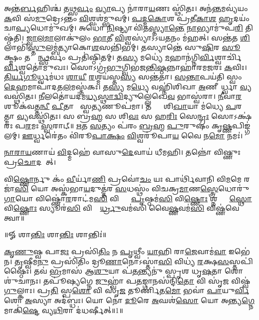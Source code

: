 𑌅𑌨𑍍𑌤॑\ul{𑌰𑍍𑌬}𑌹𑌿𑌶𑍍𑌚॑ 𑌤\ul{𑌥𑍍𑌸}\ul{𑌰𑍍𑌵𑌂} \ul{𑌵𑍍𑌯𑌾}𑌪𑍍𑌯 𑌨𑌾॑𑌰𑌾\ul{𑌯}𑌣𑌃 𑌸𑍍𑌥𑌿॑𑌤𑌃। 𑌅𑌨॑\ul{𑌨𑍍𑌤}𑌮𑌵𑍍𑌯॑𑌯𑌂 \ul{𑌕}𑌵𑌿 𑌸॑\ul{𑌮𑍁}𑌦𑍍𑌰𑍇𑌽𑌨𑍍𑌤𑌂॑  \ul{𑌵𑌿}𑌶𑍍𑌵𑌶॑𑌮𑍍𑌭𑍁𑌵𑌮𑍍। \ul{𑌪}\ul{𑌦𑍍𑌮}\ul{𑌕𑍋}𑌶 𑌪𑍍𑌰॑𑌤𑍀\ul{𑌕𑌾}\ul{𑌶}\ul{} \ul{𑌹𑍃}𑌦𑌯𑌂॑ 𑌚𑌾\ul{𑌪𑍍𑌯}𑌧𑍋𑌮𑍁॑𑌖𑌮𑍍। 𑌅𑌧𑍋॑ \ul{𑌨𑌿}𑌷𑍍𑌟𑍍𑌯𑌾 𑌵𑌿॑𑌤\ul{𑌸𑍍𑌤𑍍𑌯𑌾}\ul{𑌨𑍍𑌤𑍇} \ul{𑌨𑌾}𑌭𑍍𑌯𑌾𑌮𑍁॑𑌪\ul{𑌰𑌿} 𑌤𑌿𑌷𑍍𑌠॑𑌤𑌿। \ul{𑌜𑍍𑌵𑌾}\ul{𑌲}\ul{𑌮𑌾}𑌲𑌾𑌕𑍁॑𑌲𑌂 \ul{𑌭𑌾}\ul{𑌤𑍀} \ul{𑌵𑌿}𑌶𑍍𑌵𑌸𑍍𑌯𑌾॑𑌽𑌽𑌯\ul{𑌤}𑌨𑌂 𑌮॑𑌹𑌤𑍍। 𑌸𑌨𑍍𑌤॑𑌤 \ul{𑌶𑌿}𑌲𑌾𑌭𑌿॑\ul{𑌸𑍍𑌤𑍁}\-𑌲𑌮𑍍𑌬॑𑌤𑍍𑌯𑌾𑌕𑍋\ul{𑌶}𑌸𑌨𑍍𑌨𑌿॑𑌭𑌮𑍍। 𑌤𑌸𑍍𑌯𑌾𑌨𑍍𑌤𑍇॑ 𑌸𑍁\ul{𑌷𑌿}𑌰 \ul{𑌸𑍂}𑌕𑍍𑌷𑍍𑌮𑌂 𑌤𑌸𑍍𑌮𑌿᳚\ul{𑌨𑍍𑌥𑍍𑌸}𑌰𑍍𑌵𑌂 𑌪𑍍𑌰𑌤𑌿॑𑌷𑍍𑌠𑌿𑌤𑌮𑍍। 𑌤\ul{𑌸𑍍𑌯} 𑌮𑌧𑍍𑌯𑍇॑ \ul{𑌮}𑌹𑌾𑌨॑\-𑌗𑍍𑌨𑌿\ul{𑌰𑍍𑌵𑌿}𑌶𑍍𑌵𑌾𑌰𑍍𑌚𑌿॑\ul{𑌰𑍍𑌵𑌿}𑌶𑍍𑌵𑌤𑍋॑𑌮𑍁𑌖𑌃। 𑌸𑍋𑌽𑌗𑍍𑌰॑\ul{𑌭𑍁}𑌗𑍍𑌵𑌿𑌭॑𑌜\ul{𑌨𑍍𑌤𑌿}\ul{𑌷𑍍𑌠}𑌨𑍍𑌨𑌾𑌹𑌾॑𑌰𑌮\ul{𑌜}𑌰𑌃 \ul{𑌕}𑌵𑌿𑌃। \ul{𑌤𑌿}\ul{𑌰𑍍𑌯}\ul{𑌗𑍂}𑌰𑍍𑌧𑍍𑌵𑌮॑𑌧𑌃 \ul{𑌶𑌾}\ul{𑌯𑍀} \ul{𑌰}𑌶𑍍𑌮𑌯॑𑌸𑍍𑌤\ul{𑌸𑍍𑌯} 𑌸𑌨𑍍𑌤॑𑌤𑌾। \ul{𑌸}\ul{𑌨𑍍𑌤𑌾}𑌪𑌯॑𑌤𑌿 𑌸𑍍𑌵𑌂 \ul{𑌦𑍇}𑌹𑌮𑌾𑌪𑌾॑𑌦𑌤\ul{𑌲}𑌮𑌸𑍍𑌤॑𑌕𑌃। 𑌤\ul{𑌸𑍍𑌯} 𑌮\ul{𑌧𑍍𑌯𑍇} 𑌵𑌹𑍍𑌨𑌿॑𑌶𑌿𑌖𑌾 \ul{𑌅}𑌣𑍀𑌯𑍋᳚𑌰𑍍𑌧𑍍𑌵𑌾 \ul{𑌵𑍍𑌯}𑌵𑌸𑍍𑌥𑌿॑𑌤𑌃। \ul{𑌨𑍀}𑌲𑌤𑍋॑𑌯𑌦॑\-𑌮\ul{𑌧𑍍𑌯}\ul{𑌸𑍍𑌥𑌾}\ul{𑌦𑍍𑌵𑌿}𑌦𑍍𑌯𑍁𑌲𑍍𑌲𑍇॑𑌖𑍇\ul{𑌵}  𑌭𑌾𑌸𑍍𑌵॑𑌰𑌾। \ul{𑌨𑍀}𑌵𑌾\ul{𑌰}𑌶𑍂𑌕॑𑌵\ul{𑌤𑍍𑌤}\ul{𑌨𑍍𑌵𑍀} \ul{𑌪𑍀}𑌤𑌾 𑌭𑌾᳚𑌸𑍍𑌵\ul{𑌤𑍍𑌯}𑌣𑍂𑌪॑𑌮𑌾। 𑌤𑌸𑍍𑌯𑌾𑌃᳚ 𑌶𑌿\ul{𑌖𑌾}𑌯𑌾 𑌮॑𑌧𑍍𑌯𑍇 \ul{𑌪}𑌰𑌮𑌾᳚𑌤𑍍𑌮𑌾 \ul{𑌵𑍍𑌯}𑌵𑌸𑍍𑌥𑌿॑𑌤𑌃। 𑌸 𑌬𑍍𑌰\ul{𑌹𑍍𑌮} 𑌸 𑌶𑌿\ul{𑌵𑌃} 𑌸 𑌹\ul{𑌰𑌿𑌃} 𑌸𑍇\ul{𑌨𑍍𑌦𑍍𑌰𑌃} 𑌸𑍋𑌽𑌕𑍍𑌷॑𑌰𑌃 𑌪\ul{𑌰}𑌮𑌃 \ul{𑌸𑍍𑌵}𑌰𑌾𑌟𑍍॥ 
\ul{𑌋}𑌤 \ul{𑌸}𑌤𑍍𑌯𑌂 𑌪॑𑌰𑌂 \ul{𑌬𑍍𑌰}\ul{𑌹𑍍𑌮} \ul{𑌪𑍁}𑌰𑍁𑌷𑌂॑ 𑌕𑍃\ul{𑌷𑍍𑌣}𑌪𑌿𑌙𑍍𑌗॑𑌲𑌮𑍍। \ul{𑌊}𑌰𑍍𑌧𑍍𑌵𑌰𑍇॑𑌤𑌂 𑌵𑌿॑𑌰𑍂\ul{𑌪𑌾}\ul{𑌕𑍍𑌷𑌂} \ul{𑌵𑌿}𑌶𑍍𑌵𑌰𑍂॑𑌪𑌾\ul{𑌯} 𑌵𑍈 𑌨\ul{𑌮𑍋} 𑌨𑌮𑌃॑। 

\ul{𑌨𑌾}\ul{𑌰𑌾}\ul{𑌯}𑌣𑌾𑌯॑ \ul{𑌵𑌿}𑌦𑍍𑌮𑌹𑍇॑ 𑌵𑌾𑌸𑍁\ul{𑌦𑍇}𑌵𑌾𑌯॑ 𑌧𑍀𑌮𑌹𑌿। 𑌤𑌨𑍍𑌨𑍋॑ 𑌵𑌿𑌷𑍍𑌣𑍁𑌃 𑌪𑍍𑌰\ul{𑌚𑍋}𑌦𑌯𑌾᳚𑌤𑍍। 

𑌵𑌿\ul{𑌷𑍍𑌣𑍋}𑌰𑍍𑌨𑍁 𑌕𑌂॑ \ul{𑌵𑍀}𑌰𑍍𑌯𑌾॑\ul{𑌣𑌿} 𑌪𑍍𑌰𑌵𑍋॑\ul{𑌚𑌂} 𑌯𑌃 𑌪𑌾𑌰𑍍𑌥𑌿॑𑌵𑌾𑌨𑌿 𑌵𑌿\ul{𑌮}𑌮𑍇 𑌰𑌜𑌾॑\ul{𑌸𑌿} 𑌯𑍋 𑌅𑌸𑍍𑌕॑𑌭𑌾\ul{𑌯}𑌦𑍁𑌤𑍍𑌤॑𑌰 \ul{𑌸}𑌧𑌸𑍍𑌥𑌂॑ 𑌵𑌿𑌚𑌕𑍍𑌰\ul{𑌮𑌾}𑌣\ul{𑌸𑍍𑌤𑍍𑌰𑍇}𑌧𑍋𑌰𑍁॑\ul{𑌗𑌾}𑌯𑍋 𑌵𑌿𑌷𑍍𑌣𑍋॑\ul{𑌰}𑌰𑌾𑌟॑𑌮\ul{𑌸𑌿} 𑌵𑌿𑌷𑍍𑌣𑍋𑌃᳚ \ul{𑌪𑍃}𑌷𑍍𑌠𑌮॑\ul{𑌸𑌿} 𑌵𑌿\ul{𑌷𑍍𑌣𑍋𑌃} 𑌶𑍍𑌨𑌪𑍍𑌤𑍍𑌰𑍇᳚\ul{𑌸𑍍𑌥𑍋} 𑌵𑌿\ul{𑌷𑍍𑌣𑍋𑌃} 𑌸𑍍𑌯𑍂𑌰॑\ul{𑌸𑌿} 𑌵𑌿𑌷𑍍𑌣𑍋᳚\ul{𑌰𑍍𑌧𑍍𑌰𑍁}𑌵𑌮॑𑌸𑌿 𑌵𑍈\ul{𑌷𑍍𑌣}𑌵𑌮॑\ul{𑌸𑌿} 𑌵𑌿𑌷𑍍𑌣॑𑌵𑍇 𑌤𑍍𑌵𑌾॥ 

\centerline{॥𑍐 𑌶𑌾\ul{𑌨𑍍𑌤𑌿𑌃} 𑌶𑌾\ul{𑌨𑍍𑌤𑌿𑌃} 𑌶𑌾𑌨𑍍𑌤𑌿𑌃॑॥}

\ul{𑌕𑍃}\ul{𑌣𑍁}𑌷𑍍𑌵 𑌪𑌾\ul{𑌜𑌃} 𑌪𑍍𑌰𑌸𑌿॑\ul{𑌤𑌿𑌂} 𑌨 \ul{𑌪𑍃}𑌥𑍍𑌵𑍀𑌂 \ul{𑌯𑌾}𑌹𑌿 𑌰𑌾\ul{𑌜𑍇}𑌵𑌾𑌮॑\ul{𑌵𑌾}\ul{} 𑌇𑌭𑍇॑𑌨। \ul{𑌤𑍃}𑌷𑍍𑌵𑍀𑌮\ul{𑌨𑍁} 𑌪𑍍𑌰𑌸𑌿॑𑌤𑌿𑌂 𑌦𑍍𑌰𑍂\ul{𑌣𑌾}𑌨𑍋𑌽𑌸𑍍𑌤𑌾॑\ul{𑌸𑌿} 𑌵𑌿𑌧𑍍𑌯॑ \ul{𑌰}𑌕𑍍𑌷\ul{𑌸}𑌸𑍍𑌤𑌪𑌿॑𑌷𑍍𑌠𑍈𑌃। 𑌤𑌵॑ \ul{𑌭𑍍𑌰}𑌮𑌾𑌸॑ 𑌆\ul{𑌶𑍁}𑌯𑌾 𑌪॑\ul{𑌤}𑌨𑍍𑌤𑍍𑌯𑌨𑍁॑ 𑌸𑍍𑌪𑍃𑌶 𑌧𑍃\ul{𑌷}𑌤𑌾 𑌶𑍋𑌶𑍁॑𑌚𑌾𑌨𑌃। 𑌤𑌪𑍂॑𑌷𑍍𑌯𑌗𑍍𑌨𑍇 \ul{𑌜𑍁}𑌹𑍍𑌵𑌾॑ 𑌪\ul{𑌤}𑌙𑍍𑌗𑌾𑌨𑌸॑𑌨𑍍𑌦𑌿\ul{𑌤𑍋} 𑌵𑌿 𑌸𑍃॑\ul{𑌜} 𑌵𑌿𑌷𑍍𑌵॑\ul{𑌗𑍁}𑌲𑍍𑌕𑌾𑌃। 𑌪𑍍𑌰\ul{𑌤𑌿} 𑌸𑍍𑌪\ul{𑌶𑍋} 𑌵𑌿 𑌸𑍃॑\ul{𑌜} 𑌤𑍂𑌰𑍍𑌣𑌿॑𑌤\ul{𑌮𑍋} 𑌭𑌵𑌾॑ \ul{𑌪𑌾}𑌯𑍁\ul{𑌰𑍍𑌵𑌿}𑌶𑍋 \ul{𑌅}𑌸𑍍𑌯𑌾 𑌅𑌦॑𑌬𑍍𑌧𑌃। 𑌯𑍋 𑌨𑍋॑ \ul{𑌦𑍂}𑌰𑍇 \ul{𑌅}𑌘𑌶॑\ul{𑌸𑍋}  𑌯𑍋 𑌅𑌨𑍍𑌤𑍍𑌯\ul{𑌗𑍍𑌨𑍇} 𑌮𑌾𑌕𑌿॑\ul{𑌷𑍍𑌟𑍇} 𑌵𑍍𑌯\ul{𑌥𑌿}𑌰𑌾 𑌦॑𑌧𑌰𑍍𑌷𑍀𑌤𑍍॥1॥

